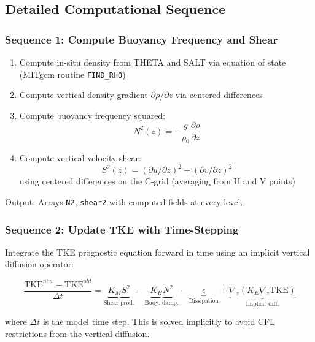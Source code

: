 \documentclass[11pt, a4paper]{article}
\begin{document}
\subsection{Detailed Computational Sequence}

\subsubsection{Sequence 1: Compute Buoyancy Frequency and Shear}

\begin{enumerate}
    \item Compute in-situ density from THETA and SALT via equation of state (MITgcm routine \texttt{FIND\_RHO})
    \item Compute vertical density gradient $\partial \rho/\partial z$ via centered differences
    \item Compute buoyancy frequency squared:
    \begin{equation}
    N^2(z) = -\frac{g}{\rho_0}\frac{\partial \rho}{\partial z}
    \end{equation}
    \item Compute vertical velocity shear:
    \begin{equation}
    S^2(z) = (\partial u/\partial z)^2 + (\partial v/\partial z)^2
    \end{equation}
    using centered differences on the C-grid (averaging from U and V points)
\end{enumerate}

Output: Arrays \texttt{N2}, \texttt{shear2} with computed fields at every level.

\subsubsection{Sequence 2: Update TKE with Time-Stepping}

Integrate the TKE prognostic equation forward in time using an implicit vertical diffusion operator:

\begin{equation}
\frac{\text{TKE}^{new} - \text{TKE}^{old}}{\Delta t} = \underbrace{K_M S^2}_{\text{Shear prod.}} - \underbrace{K_H N^2}_{\text{Buoy. damp.}} - \underbrace{\epsilon}_{\text{Dissipation}} + \underbrace{\nabla_z(K_E \nabla_z \text{TKE})}_{\text{Implicit diff.}}
\end{equation}

where $\Delta t$ is the model time step. This is solved implicitly to avoid CFL restrictions from the vertical diffusion.
\end{document}
